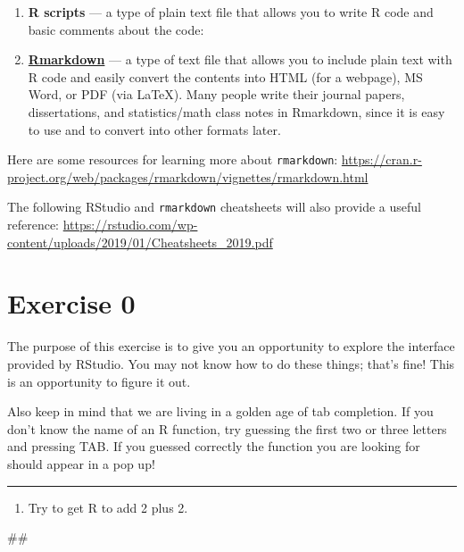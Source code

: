 \documentclass[]{book}
\newenvironment{Shaded}{\begin{snugshade}}{\end{snugshade}}
\newcommand{\NormalTok}[1]{#1}
\providecommand{\tightlist}{%
  \setlength{\itemsep}{0pt}\setlength{\parskip}{0pt}}
\begin{document}
\begin{enumerate}
\def\labelenumi{\arabic{enumi}.}
\item
  \textbf{R scripts} --- a type of plain text file that allows you to
  write R code and basic comments about the code:
\item
  \href{https://rmarkdown.rstudio.com/}{\textbf{Rmarkdown}} --- a type
  of text file that allows you to include plain text with R code and
  easily convert the contents into HTML (for a webpage), MS Word, or PDF
  (via LaTeX). Many people write their journal papers, dissertations,
  and statistics/math class notes in Rmarkdown, since it is easy to use
  and to convert into other formats later.
\end{enumerate}

Here are some resources for learning more about \texttt{rmarkdown}:
\url{https://cran.r-project.org/web/packages/rmarkdown/vignettes/rmarkdown.html}

The following RStudio and \texttt{rmarkdown} cheatsheets will also
provide a useful reference:
\url{https://rstudio.com/wp-content/uploads/2019/01/Cheatsheets_2019.pdf}

\section{Exercise 0}\label{exercise-0}

The purpose of this exercise is to give you an opportunity to explore
the interface provided by RStudio. You may not know how to do these
things; that's fine! This is an opportunity to figure it out.

Also keep in mind that we are living in a golden age of tab completion.
If you don't know the name of an R function, try guessing the first two
or three letters and pressing TAB. If you guessed correctly the function
you are looking for should appear in a pop up!

\begin{center}\rule{0.5\linewidth}{\linethickness}\end{center}

\begin{enumerate}
\def\labelenumi{\arabic{enumi}.}
\tightlist
\item
  Try to get R to add 2 plus 2.
\end{enumerate}

\begin{Shaded}
\begin{Highlighting}[]
\NormalTok{##}
\end{Highlighting}
\end{Shaded}
\end{document}
